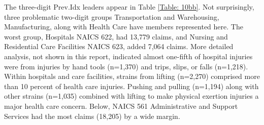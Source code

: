 \documentclass[9pt, oneside]{article}   	%
\begin{document}
    
\pagebreak




The three-digit Prev.Idx leaders appear in Table \ref{Table: 10bb}. Not surprisingly, three problematic two-digit groups Transportation and Warehousing, Manufacturing, along with Health Care have members represented here. The worst group, Hospitals NAICS 622, had 13,779 claims, and Nursing and Residential Care Facilities NAICS 623, added 7,064 claims. More detailed analysis, not shown in this report, indicated almost one-fifth of hospital injuries were from injuries by hand tools (n=1,370) and trips, slips, or falls (n=1,218).   Within hospitals and care facilities, strains from lifting (n=2,270) comprised more than 10 percent of health care injuries. Pushing and pulling (n=1,194) along with other strains (n=1,035) combined with lifting to make physical exertion injuries a major health care concern. Below, NAICS 561 Administrative and Support Services had the most claims (18,205) by a wide margin. 




\end{document}

